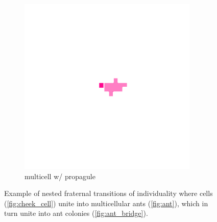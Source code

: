 \begin{figure}
\begin{columns}
\begin{column}{0.25\textwidth}
  \begin{subfigure}[b]{\textwidth}
    \includegraphics[width=\textwidth,trim={300 300 250 250},clip]{img/lifecycle-3}
    \caption{multicell w/ propagule}
    \label{fig:lifecycle-3}
  \end{subfigure}%
\end{column}
\begin{column}{0.2\textwidth}
\caption{
Example of nested fraternal transitions of individuality where cells (\ref{fig:cheek_cell}) unite into multicellular ants (\ref{fig:ant}), which in turn unite into ant colonies (\ref{fig:ant_bridge}).
}
\label{fig:fraternal}
\end{column}
\end{columns}
\end{figure}
